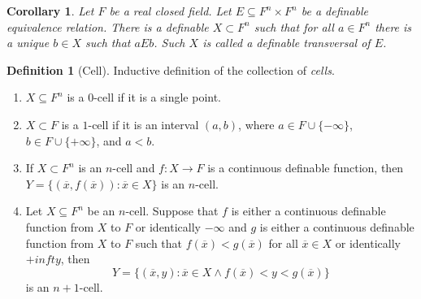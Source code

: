 \documentclass{amsart}
\newtheorem{lemma}[theorem]{Lemma}
\newtheorem{corollary}[theorem]{Corollary}
\theoremstyle{definition}
\newtheorem{definition}[theorem]{Definition}
\numberwithin{equation}{section}
\begin{document}

\begin{corollary}
	Let $F$ be a real closed field.
	Let $E \subseteq F^n \times F^n$ be a definable equivalence relation.
	There is a definable $X \subset F^n$ such that for all
	$a \in F^n$ there is a unique $b\in X$ such that $aEb$.
	Such $X$ is called a definable \emph{transversal} of $E$.
\end{corollary}

\begin{definition}[Cell]
	Inductive definition of the collection of \emph{cells}.
	\begin{enumerate}[label = {$\bullet$}]
		\item $X \subseteq F^n$ is a $0$-cell if it is a single point.
		\item $X \subset F$ is a $1$-cell if it is an interval $(a,b)$,
		      where $a \in F \cup \{-\infty\}$, $b\in F\cup \{+\infty\}$, and $a < b$.
		\item If $X \subset F^n$ is an $n$-cell and $f: X\to F$ is a continuous definable function,
		      then $Y = \{(\overline{x},f(\overline{x})): \overline{x} \in X\}$ is an $n$-cell.
		\item Let $X \subseteq F^n$ be an $n$-cell. Suppose that $f$ is
		      either a continuous definable function from $X$ to $F$ or identically $-\infty$ and
		      $g$ is either a continuous definable function from $X$ to $F$
		      such that $f(\overline{x}) < g(\overline{x})$ for all $\overline{x} \in X$ or identically $+infty$, then
		      \[
			      Y = \{(\overline{x},y): \overline{x} \in X \land f(\overline{x}) < y < g(\overline{x})\}
		      \]
		      is an $n+1$-cell.
	\end{enumerate}
\end{definition}

\end{document}
